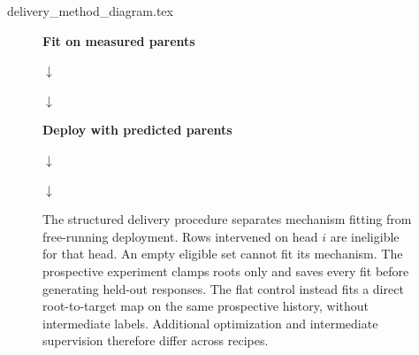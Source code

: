 \begin{filecontents*}[overwrite]{delivery_method_diagram.tex}
\begin{figure}[t]
\centering
\begin{minipage}[t]{0.47\linewidth}
\centering\small
\textbf{Fit on measured parents}\par\medskip
{}
\par\smallskip$\downarrow$\par\smallskip
{}
\par\smallskip$\downarrow$\par\smallskip
{}
\end{minipage}\hfill
\begin{minipage}[t]{0.47\linewidth}
\centering\small
\textbf{Deploy with predicted parents}\par\medskip
{}
\par\smallskip$\downarrow$\par\smallskip
{}
\par\smallskip$\downarrow$\par\smallskip
{}
\end{minipage}
\caption{The structured delivery procedure separates mechanism fitting from
free-running deployment. Rows intervened on head $i$ are ineligible for that
head. An empty eligible set cannot fit its mechanism. The prospective experiment
clamps roots only and saves every fit before generating held-out responses.
The flat control instead fits a direct root-to-target map on the same prospective
history, without intermediate labels. Additional optimization and intermediate
supervision therefore differ across recipes.}
\label{fig:delivery-procedure}
\end{figure}
\end{filecontents*}
